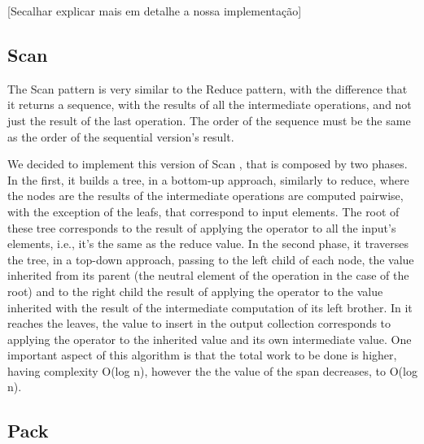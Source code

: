 \documentclass[conference,compsoc]{IEEEtran}
\begin{document}
[Secalhar explicar mais em detalhe a nossa implementação]



\subsection{Scan}

The Scan pattern is very similar to the Reduce pattern,
with the difference that it returns a sequence, with the results of all the intermediate operations, and not just the result of the last operation.
The order of the sequence must be the same as the order of the sequential version's result.

We decided to implement this version of Scan \cite{ladner1980parallel}, that is composed by two phases.
In the first, it builds a tree, in a bottom-up approach, similarly to reduce, where the nodes are the results of the intermediate operations are computed pairwise, with the exception of the leafs, that correspond to input elements. The root of these tree corresponds to the result of applying the operator to all the input's elements, i.e., it's the same as the reduce value.
In the second phase, it traverses the tree, in a top-down approach, passing to the left child of each node, the value inherited from its parent (the neutral element of the operation in the case of the root) and to the right child the result of applying the operator to the value inherited with the result of the intermediate computation of its left brother. In it reaches the leaves, the value to insert in the output collection corresponds to applying the operator to the inherited value and its own intermediate value.
One important aspect of this algorithm is that the total work to be done is higher, having complexity O(log n), however the the value of the span decreases, to O(log n).

\subsection{Pack}
\end{document}
